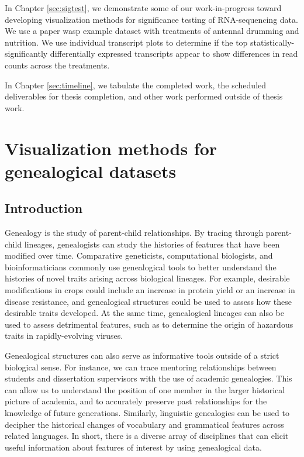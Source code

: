 \documentclass[11pt,a4paper,oldfontcommands,openany]{memoir}
\numberwithin{equation}{section} %
\begin{document}
In Chapter \ref{sec:sigtest}, we demonstrate some of our work-in-progress toward developing visualization methods for significance testing of RNA-sequencing data. We use a paper wasp example dataset with treatments of antennal drumming and nutrition. We use individual transcript plots to determine if the top statistically-significantly differentially expressed transcripts appear to show differences in read counts across the treatments.

In Chapter \ref{sec:timeline}, we tabulate the completed work, the scheduled deliverables for thesis completion, and other work performed outside of thesis work.



 
\chapter{Visualization methods for genealogical datasets}
\label{sec:chapter1}

\section{Introduction}

Genealogy is the study of parent-child relationships. By tracing through parent-child lineages, genealogists can study the histories of features that have been modified over time. Comparative geneticists, computational biologists, and bioinformaticians commonly use genealogical tools to better understand the histories of novel traits arising across biological lineages. For example, desirable modifications in crops could include an increase in protein yield or an increase in disease resistance, and genealogical structures could be used to assess how these desirable traits developed. At the same time, genealogical lineages can also be used to assess detrimental features, such as to determine the origin of hazardous traits in rapidly-evolving viruses.

Genealogical structures can also serve as informative tools outside of a strict biological sense. For instance, we can trace mentoring relationships between students and dissertation supervisors with the use of academic genealogies. This can allow us to understand the position of one member in the larger historical picture of academia, and to accurately preserve past relationships for the knowledge of future generations. Similarly, linguistic genealogies can be used to decipher the historical changes of vocabulary and grammatical features across related languages. In short, there is a diverse array of disciplines that can elicit useful information about features of interest by using genealogical data.
\end{document}
